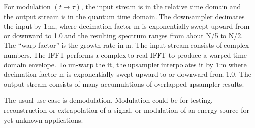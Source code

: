 For modulation $(t \rightarrow \tau)$, the input stream is in the relative time
domain and the output stream is in the quantum time domain. The downsampler
decimates the input by 1:m, where decimation factor m is exponentially swept
upward from or downward to 1.0 and the resulting spectrum ranges from about
N/5 to N/2.
The ``warp factor'' is the growth rate in m.
The input stream consists of complex numbers.
The IFFT performs a complex-to-real IFFT to produce a warped time domain
envelope. To un-warp the it, the upsampler interpolates it by 1:m
where decimation factor m is exponentially swept upward to or downward from 1.0.
The output stream consists of many accumulations of overlapped upsampler results.

The usual use case is demodulation.
Modulation could be for testing, reconstruction or extrapolation of a signal,
or modulation of an energy source for yet unknown applications.

